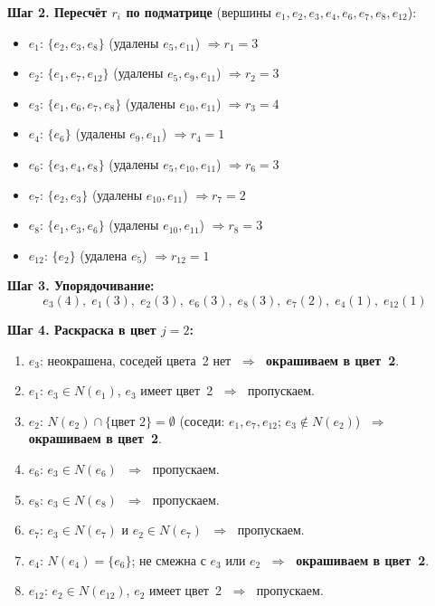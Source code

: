 \documentclass[a4paper,12pt]{article}
\begin{document}
\textbf{Шаг 2. Пересчёт $r_i$ по подматрице} (вершины $e_1, e_2, e_3, e_4, e_6, e_7, e_8, e_{12}$):

\begin{itemize}
	\item $e_1$: $\{e_2, e_3, e_8\}$ (удалены $e_5, e_{11}$) $\Rightarrow r_1 = 3$
	\item $e_2$: $\{e_1, e_7, e_{12}\}$ (удалены $e_5, e_9, e_{11}$) $\Rightarrow r_2 = 3$
	\item $e_3$: $\{e_1, e_6, e_7, e_8\}$ (удалены $e_{10}, e_{11}$) $\Rightarrow r_3 = 4$
	\item $e_4$: $\{e_6\}$ (удалены $e_9, e_{11}$) $\Rightarrow r_4 = 1$
	\item $e_6$: $\{e_3, e_4, e_8\}$ (удалены $e_5, e_{10}, e_{11}$) $\Rightarrow r_6 = 3$
	\item $e_7$: $\{e_2, e_3\}$ (удалены $e_{10}, e_{11}$) $\Rightarrow r_7 = 2$
	\item $e_8$: $\{e_1, e_3, e_6\}$ (удалены $e_{10}, e_{11}$) $\Rightarrow r_8 = 3$
	\item $e_{12}$: $\{e_2\}$ (удалена $e_5$) $\Rightarrow r_{12} = 1$
\end{itemize}

\textbf{Шаг 3. Упорядочивание:}
\[
	e_3(4),\; e_1(3),\; e_2(3),\; e_6(3),\; e_8(3),\; e_7(2),\; e_4(1),\; e_{12}(1)
\]

\textbf{Шаг 4. Раскраска в цвет $j = 2$:}

\begin{enumerate}
	\item $e_3$: неокрашена, соседей цвета~2 нет $\;\Rightarrow\;$ \textbf{окрашиваем в цвет~2}.
	\item $e_1$: $e_3 \in N(e_1)$, $e_3$ имеет цвет~2 $\;\Rightarrow\;$ пропускаем.
	\item $e_2$: $N(e_2) \cap \{\text{цвет~2}\} = \emptyset$ (соседи: $e_1, e_7, e_{12}$; $e_3 \notin N(e_2)$)
	      $\;\Rightarrow\;$ \textbf{окрашиваем в цвет~2}.
	\item $e_6$: $e_3 \in N(e_6)$ $\;\Rightarrow\;$ пропускаем.
	\item $e_8$: $e_3 \in N(e_8)$ $\;\Rightarrow\;$ пропускаем.
	\item $e_7$: $e_3 \in N(e_7)$ и $e_2 \in N(e_7)$ $\;\Rightarrow\;$ пропускаем.
	\item $e_4$: $N(e_4) = \{e_6\}$; не смежна с $e_3$ или $e_2$
	      $\;\Rightarrow\;$ \textbf{окрашиваем в цвет~2}.
	\item $e_{12}$: $e_2 \in N(e_{12})$, $e_2$ имеет цвет~2 $\;\Rightarrow\;$ пропускаем.
\end{enumerate}
\end{document}

